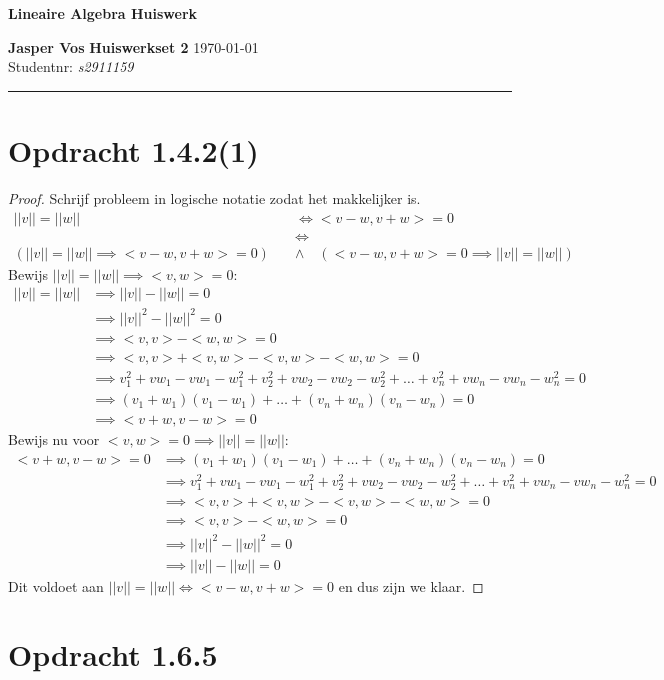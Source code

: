 \documentclass{article}
\begin{document}
{\Large \textbf{Lineaire Algebra Huiswerk}}

\bigskip

\textbf{Jasper Vos} \hfill \textbf{Huiswerkset 2} \hfill \today \\
Studentnr: \emph{s2911159} 

\rule{\textwidth}{2pt}

\bigskip

\section*{Opdracht 1.4.2(1)}
\begin{proof}
    Schrijf probleem in logische notatie zodat het makkelijker is.
    \begin{align*}
        ||v|| = ||w|| &\Leftrightarrow <v-w, v+w> = 0 \\
        &\Leftrightarrow \\
        (||v|| = ||w|| \implies <v-w, v+w> = 0) \quad &\wedge \quad (<v-w, v+w> = 0 \implies ||v|| = ||w||)
    \end{align*}
    Bewijs $||v|| = ||w|| \implies <v, w> = 0$:
    \begin{align*}
        \boxed{||v|| = ||w||} &\implies ||v|| - ||w|| = 0 \\
        &\implies ||v||^2 - ||w||^2 = 0 \\
        &\implies <v, v> - <w, w> = 0 \\
        &\implies <v, v> + <v, w> - <v, w> - <w, w> = 0 \\
        &\implies v_1^2 + vw_1 - vw_1 - w_1^2 + v_2^2 + vw_2 -vw_2 -w_2^2 + \dots + v_n^2 + vw_n - vw_n -w_n^2 = 0 \\
        &\implies (v_1 + w_1)(v_1 - w_1) + \dots + (v_n + w_n)(v_n - w_n) = 0 \\
        &\implies \boxed{<v+w, v-w> = 0}
    \end{align*}
    Bewijs nu voor $<v, w> = 0 \implies ||v|| = ||w||$:
    \begin{align*}
        \boxed{<v+w, v-w> = 0} &\implies (v_1 + w_1)(v_1 - w_1) + \dots + (v_n + w_n)(v_n - w_n) = 0 \\
        &\implies v_1^2 + vw_1 - vw_1 - w_1^2 + v_2^2 + vw_2 -vw_2 -w_2^2 + \dots + v_n^2 + vw_n - vw_n -w_n^2 = 0 \\
        &\implies <v, v> + <v, w> - <v, w> - <w, w> = 0 \\
        &\implies <v, v> - <w, w> = 0 \\
        &\implies ||v||^2 - ||w||^2 = 0 \\
        &\implies \boxed{||v|| - ||w|| = 0}
    \end{align*}
    Dit voldoet aan $||v|| = ||w|| \Leftrightarrow <v-w, v+w> = 0$ en dus zijn we klaar.
\end{proof}
\section*{Opdracht 1.6.5}
\end{document}
